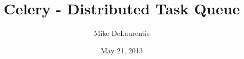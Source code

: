 \documentclass{beamer}
\title{Celery - Distributed Task Queue}
\author{Mike DeLaurentis}
\date{May 21, 2013}
\begin{document}
\begin{frame}[plain]
\titlepage
\end{frame}
\end{document}
